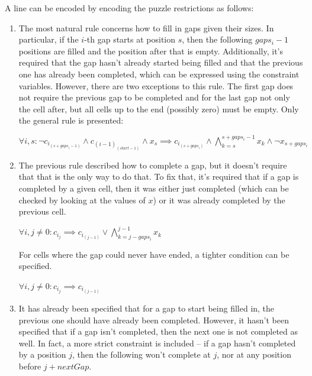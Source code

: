 \documentclass[12pt]{article}
\begin{document}
A line can be encoded by encoding the puzzle restrictions as follows:
\begin{enumerate}
  \item The most natural rule concerns how to fill in gaps given their sizes.
        In particular, if the $i$-th gap starts at position $s$, then the following $gaps_i - 1$ positions are filled and the position after that is empty.
        Additionally, it's required that the gap hasn't already started being filled and that the previous one has already been completed, which can be expressed using the constraint variables.
        However, there are two exceptions to this rule.
        The first gap does not require the previous gap to be completed and for the last gap not only the cell after, but all cells up to the end (possibly zero) must be empty.
        Only the general rule is presented:
        \begin{center}
          $\forall i, s: \neg c_{i}_{(s+gaps_i-1)} \wedge c_{(i-1)}_{(start-1)} \wedge x_s \implies c_{i}_{(s+gaps_i)} \wedge \bigwedge_{k=s}^{s+gaps_i-1} x_k \wedge \neg x_{s+gaps_i}$
        \end{center}


    \item The previous rule described how to complete a gap, but it doesn't require that that is the only way to do that.
          To fix that, it's required that if a gap is completed by a given cell, then it was either just completed (which can be checked by looking at the values of $x$) or it was already completed by the previous cell.
          \begin{center}
            $\forall i, j \ne 0: c_{i}_{j} \implies c_{i}_{(j-1)} \vee \bigwedge_{k=j-gaps_i}^{j-1} x_k$
          \end{center}

          For cells where the gap could never have ended, a tighter condition can be specified.
          \begin{center}
            $\forall i, j \ne 0: c_{i}_{j} \implies c_{i}_{(j-1)}$
          \end{center}

  \item It has already been specified that for a gap to start being filled in, the previous one should have already been completed. However, it hasn't been specified that if a gap isn't completed, then the next one is not completed as well. In fact, a more strict constraint is included -- if a gap hasn't completed by a position $j$, then the following won't complete at $j$, nor at any position before $j+nextGap$.


\end{enumerate}
\end{document}
